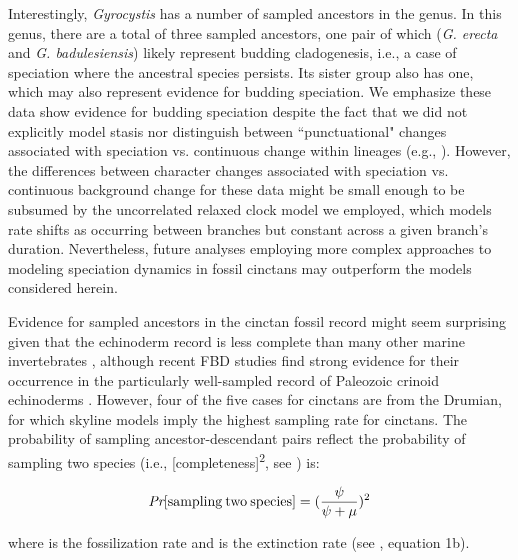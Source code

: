 \documentclass{article}
\begin{document}
Interestingly, \textit{Gyrocystis} has a number of sampled ancestors in the genus. In this genus, there are a total of three sampled ancestors, one pair of which (\textit{G. erecta} and \textit{G. badulesiensis}) likely represent budding cladogenesis, i.e., a case of speciation where the ancestral species persists. Its sister group also has one, which may also represent evidence for budding speciation. We emphasize these data show evidence for budding speciation despite the fact that we did not explicitly model stasis nor distinguish between ``punctuational" changes associated with speciation vs. continuous change within lineages (e.g., \citealp{EldredgeGould1972, WagnerMarcot2010}). However, the differences between character changes associated with speciation vs. continuous background change for these data might be small enough to be subsumed by the uncorrelated relaxed clock model we employed, which models rate shifts as occurring between branches but constant across a given branch's duration. Nevertheless, future analyses employing more complex approaches to modeling speciation dynamics in fossil cinctans may outperform the models considered herein.

Evidence for sampled ancestors in the cinctan fossil record might seem surprising given that the echinoderm record is less complete than many other marine invertebrates \citep{FooteSepkoski1999}, although recent FBD studies find strong evidence for their occurrence in the particularly well-sampled record of Paleozoic crinoid echinoderms \citep{Wright2017jp, WrightToom2017}.  However, four of the five cases for cinctans are from the Drumian, for which skyline models imply the highest sampling rate for cinctans. The probability of sampling ancestor-descendant pairs reflect the probability of sampling two species (i.e., [completeness]\textsuperscript{2}, see \citealp{Foote1996c}) is: 
\begin{center}
\[\textit{Pr}\textrm{[sampling} \: \textrm{two} \: \textrm{species]} = (\frac{\psi}{\psi+\mu})\textsuperscript{2} \]
\end{center}
where \textit{{\textpsi}} is the fossilization rate and \textit{{\textmu}} is the extinction rate (see \citealp{foote1997estimating}, equation 1b).
\end{document}
